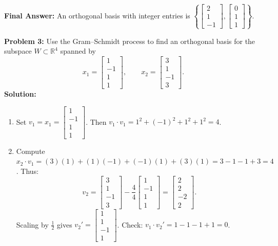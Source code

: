 \documentclass[11pt, letterpaper]{article}
\theoremstyle{definition}
\theoremstyle{remark}
\begin{document}
\textbf{Final Answer:} An orthogonal basis with integer entries is $\left\{ \begin{bmatrix} 2 \\ 1 \\ -1 \end{bmatrix}, \begin{bmatrix} 0 \\ 1 \\ 1 \end{bmatrix} \right\}$.

\vspace{0.8em}

\textbf{Problem 3:} Use the Gram--Schmidt process to find an orthogonal basis for the subspace $W \subset \mathbb{R}^4$ spanned by
\[
    x_1 = \begin{bmatrix} 1 \\ -1 \\ 1 \\ 1 \end{bmatrix}, \qquad x_2 = \begin{bmatrix} 3 \\ 1 \\ -1 \\ 3 \end{bmatrix}.
\]
\textbf{Solution:}
\begin{enumerate}[label=\textbf{Step \arabic*:}]
    \item Set $v_1 = x_1 = \begin{bmatrix} 1 \\ -1 \\ 1 \\ 1 \end{bmatrix}$. Then $v_1 \cdot v_1 = 1^2 + (-1)^2 + 1^2 + 1^2 = 4$.
    \item Compute $x_2 \cdot v_1 = (3)(1) + (1)(-1) + (-1)(1) + (3)(1) = 3 - 1 - 1 + 3 = 4$. Thus:
    \[
        v_2 = \begin{bmatrix} 3 \\ 1 \\ -1 \\ 3 \end{bmatrix} - \frac{4}{4}\begin{bmatrix} 1 \\ -1 \\ 1 \\ 1 \end{bmatrix}
        = \begin{bmatrix} 2 \\ 2 \\ -2 \\ 2 \end{bmatrix}.
    \]
    Scaling by $\frac{1}{2}$ gives $v_2' = \begin{bmatrix} 1 \\ 1 \\ -1 \\ 1 \end{bmatrix}$. Check: $v_1 \cdot v_2' = 1 - 1 - 1 + 1 = 0$.
\end{enumerate}
\end{document}
